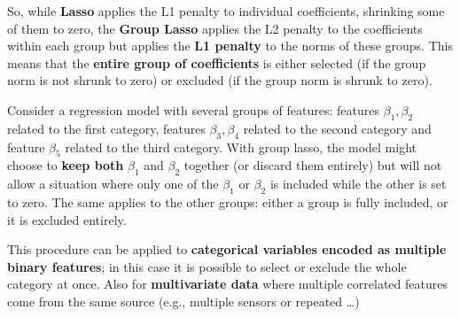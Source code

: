 So, while \textbf{Lasso} applies the L1 penalty to individual coefficients, shrinking
some of them to zero, the \textbf{Group Lasso} applies the L2 penalty to the coefficients
within each group but applies the \textbf{L1 penalty} to the norms of these groups.
This means that the \textbf{entire group of coefficients} is either selected (if the
group norm is not shrunk to zero) or excluded (if the group norm is shrunk to
zero).

\begin{example}
Consider a regression model with several groups of features:
features $\beta_1, \beta_2$ related to the first category, features $\beta_3, \beta_4$ related to the second
category and feature $\beta_5$ related to the third category. With group lasso, the
model might choose to \textbf{keep both} $\beta_1$ and $\beta_2$ together (or discard them entirely)
but will not allow a situation where only one of the $\beta_1$ or $\beta_2$ is included while
the other is set to zero. The same applies to the other groups: either a group
is fully included, or it is excluded entirely.
\end{example}

This procedure can be applied to \textbf{categorical variables encoded as
multiple binary features}; in this case it is possible to select or exclude the
whole category at once. Also for \textbf{multivariate data} where multiple correlated features come from the same source (e.g., multiple sensors or repeated
\ldots)
